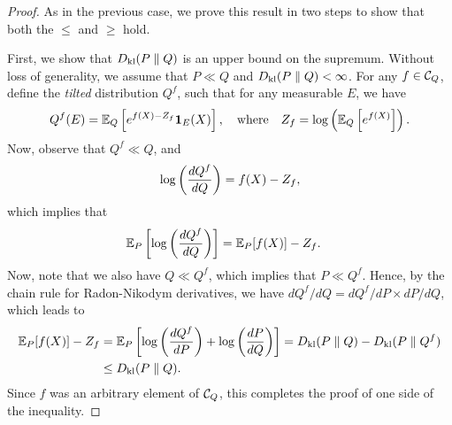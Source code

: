             \begin{proof}
                As in the previous case, we prove this result in two steps to show that both the $\leq$ and $\geq$ hold.

                First, we show that $D_{\text{kl}}(P\parallel Q)$ is an upper bound on the supremum. Without loss of generality, we assume that $P \ll Q$ and $D_{\text{kl}}(P \parallel Q)<\infty$.  For any $f \in \mathcal{C}_Q$, define the \emph{tilted} distribution $Q^f$, such that for any measurable $E$, we have 
                \begin{align}
                    Q^f(E) = \mathbb{E}_Q\left[ e^{f(X)-Z_f} \boldsymbol{1}_E(X)\right], \quad \text{where} \quad 
                    Z_f = \log\left( \mathbb{E}_Q\left[ e^{f(X)} \right]\right). 
                \end{align}
                Now, observe that $Q^f \ll Q$, and 
                \begin{align}
                    \log \left( \frac{dQ^f}{dQ} \right) = f(X) - Z_f, 
                \end{align}
                which implies that 
                \begin{align}
                 \mathbb{E}_P\left[ \log \left( \frac{dQ^f}{dQ} \right)    \right] &= \mathbb{E}_P[f(X)] - Z_f. 
                \end{align}
                Now, note that we also have $Q \ll Q^f$, which implies that $P \ll Q^f$. Hence, by the chain rule for Radon-Nikodym derivatives, we have $dQ^f/dQ = dQ^f/dP \times dP/dQ$, which leads to 
                \begin{align}
                    \mathbb{E}_P[f(X)] - Z_f &= \mathbb{E}_P\left[ \log \left( \frac{dQ^f}{dP} \right) + \log \left( \frac{dP}{dQ} \right)  \right] = D_{\text{kl}}(P \parallel Q) - D_{\text{kl}}(P \parallel Q^f) \\
                    & \leq D_{\text{kl}}(P \parallel Q). 
                \end{align}
                Since $f$ was an arbitrary element of $\mathcal{C}_Q$, this completes the proof of one side of the inequality. 


\end{proof}

